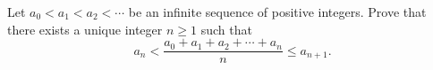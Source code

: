 Let $a_0 < a_1 < a_2 < \dotsb$ be an infinite sequence of positive integers.
Prove that there exists a unique integer $n\geq 1$ such that
\[ a_n < \frac{a_0+a_1+a_2+\dotsb+a_n}{n} \le a_{n+1}. \]